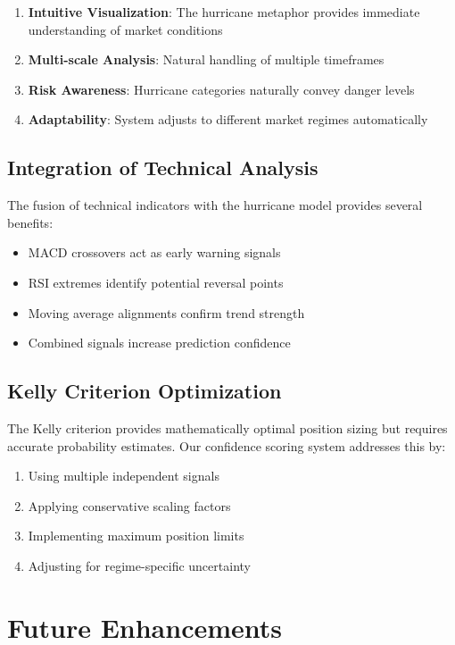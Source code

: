 \documentclass[12pt,a4paper]{article}
\begin{document}
\begin{enumerate}
    \item \textbf{Intuitive Visualization}: The hurricane metaphor provides immediate understanding of market conditions
    \item \textbf{Multi-scale Analysis}: Natural handling of multiple timeframes
    \item \textbf{Risk Awareness}: Hurricane categories naturally convey danger levels
    \item \textbf{Adaptability}: System adjusts to different market regimes automatically
\end{enumerate}

\subsection{Integration of Technical Analysis}

The fusion of technical indicators with the hurricane model provides several benefits:

\begin{itemize}
    \item MACD crossovers act as early warning signals
    \item RSI extremes identify potential reversal points
    \item Moving average alignments confirm trend strength
    \item Combined signals increase prediction confidence
\end{itemize}

\subsection{Kelly Criterion Optimization}

The Kelly criterion provides mathematically optimal position sizing but requires accurate probability estimates. Our confidence scoring system addresses this by:

\begin{enumerate}
    \item Using multiple independent signals
    \item Applying conservative scaling factors
    \item Implementing maximum position limits
    \item Adjusting for regime-specific uncertainty
\end{enumerate}

\section{Future Enhancements}
\end{document}
